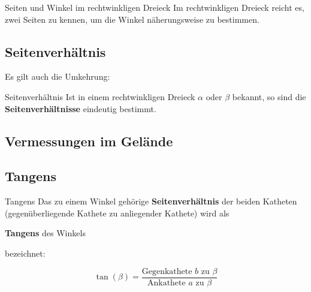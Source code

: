 \begin{gesetz}{Seiten und Winkel im rechtwinkligen Dreieck}{}
Im rechtwinkligen Dreieck reicht es, zwei Seiten zu kennen, um die
Winkel näherungsweise zu bestimmen.
\end{gesetz}


\subsection{Seitenverhältnis}
Es gilt auch die Umkehrung:
\begin{gesetz}{Seitenverhältnis}{}
Ist in einem rechtwinkligen Dreieck $\alpha$ oder $\beta$ bekannt, so
sind die \textbf{Seitenverhältnisse} eindeutig bestimmt.
\end{gesetz}
\newpage

\subsection{Vermessungen im Gelände}





\newpage
\subsection{Tangens}

\begin{definition}{Tangens}{}
Das zu einem Winkel gehörige \textbf{Seitenverhältnis} der beiden
Katheten (gegenüberliegende Kathete zu anliegender Kathete) wird als


\begin{center}\textbf{Tangens} des Winkels\end{center}
  bezeichnet:

    $$\tan(\beta) = \frac{\text{Gegenkathete } b \text{ zu }
    \beta}{\text{Ankathete } a \text{ zu } \beta}$$
\end{definition}


